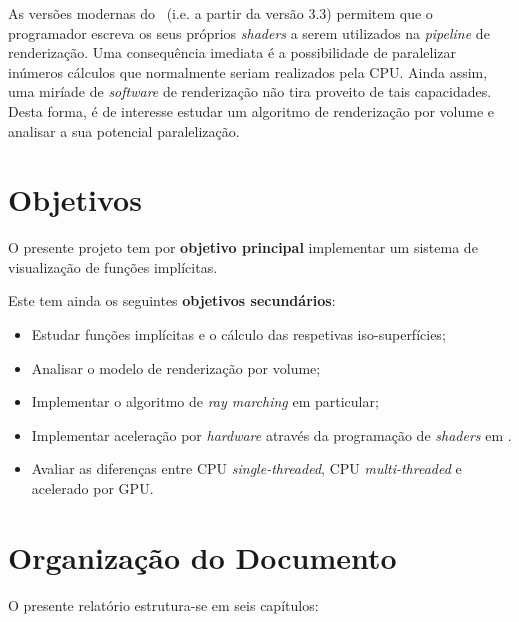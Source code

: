 As versões modernas do \opengl~(i.e. a partir da versão 3.3) permitem que o programador escreva os seus próprios \textit{shaders} a serem utilizados na \textit{pipeline} de renderização. Uma consequência imediata é a possibilidade de paralelizar inúmeros cálculos que normalmente seriam realizados pela \ac{CPU}. Ainda assim, uma miríade de \textit{software} de renderização não tira proveito de tais capacidades. Desta forma, é de interesse estudar um algoritmo de renderização por volume e analisar a sua potencial paralelização.


\section{Objetivos}
\label{sec::intro:objetivos}

O presente projeto tem por \textbf{objetivo principal} implementar um sistema de visualização de funções implícitas.

Este tem ainda os seguintes \textbf{objetivos secundários}:
\begin{itemize}[nosep]
	\item Estudar funções implícitas e o cálculo das respetivas iso-superfícies;
	\item Analisar o modelo de renderização por volume;
	\item Implementar o algoritmo de \textit{ray marching} em particular;
	\item Implementar aceleração por \textit{hardware} através da programação de \emph{shaders} em \opengl.
    \item Avaliar as diferenças entre \ac{CPU} \textit{single-threaded}, \ac{CPU} \textit{multi-threaded} e acelerado por \ac{GPU}.
\end{itemize}


\section{Organização do Documento}
\label{sec::intro:orgdoc}

O presente relatório estrutura-se em seis capítulos:

